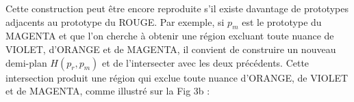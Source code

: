 \documentclass{article}
\begin{document}
\begin{enumerate}[label=\textbf{(\roman*)}]
\begin{figure}[h!]
\end{figure}


Cette construction peut être encore reproduite s’il existe davantage de prototypes adjacents au prototype du ROUGE. Par exemple, si $p_m$ est le prototype du MAGENTA et que l'on cherche à obtenir une région excluant toute nuance de VIOLET, d'ORANGE et de MAGENTA, il convient de construire un nouveau demi-plan $H(p_r, p_m)$ et de l'intersecter avec les deux précédents. Cette intersection produit une région qui exclue toute nuance d'ORANGE, de VIOLET et de MAGENTA, comme illustré sur la Fig 3b :


\begin{figure}[h!]
\centering %

\begin{minipage}{0.48\textwidth}
\centering
{}
\end{minipage}
\end{figure}
\end{enumerate}
\end{document}
